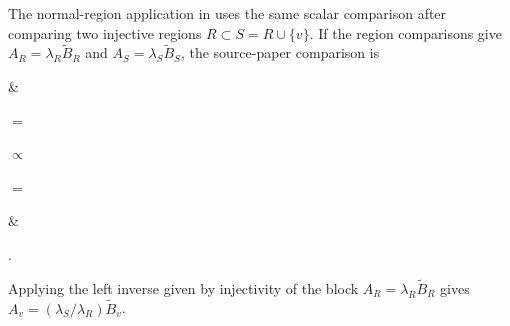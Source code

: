 \begin{remark}
    The normal-region application in \cite[Section~4]{Molnar2018NormalPEPS}
    uses the same scalar comparison after comparing two injective regions
    $R\subset S=R\cup\{v\}$. If the region comparisons give
    $A_R=\lambda_R\widetilde B_R$ and
    $A_S=\lambda_S\widetilde B_S$, the source-paper comparison is
    \begin{center}
        \tenkzkernel
        \begin{tenkz}[rows={wire}, cols=2, west=open, east=open, physical=up]
             & 
        \end{tenkz}
        \quad$=$\quad
        \begin{tenkz}[rows={wire}, cols=1, west=open, east=open, physical=up]
        \end{tenkz}
        \quad$\propto$\quad
        \begin{tenkz}[rows={wire}, cols=1, west=open, east=open, physical=up]
        \end{tenkz}
        \quad$=$\quad
        \begin{tenkz}[rows={wire}, cols=2, west=open, east=open, physical=up]
             & 
        \end{tenkz}.
    \end{center}
    Applying the left inverse given by injectivity of the block
    $A_R=\lambda_R\widetilde B_R$ gives
    $A_v=(\lambda_S/\lambda_R)\widetilde B_v$.
\end{remark}

